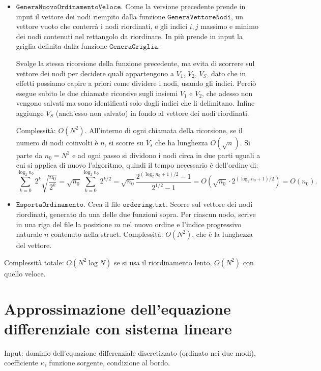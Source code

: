 \documentclass{article}
\begin{document}
\begin{itemize}
\item $\texttt{GeneraNuovoOrdinamentoVeloce}$.
Come la versione precedente prende in input il vettore dei nodi riempito dalla funzione $\texttt{GeneraVettoreNodi}$, un vettore vuoto che conterrà i nodi riordinati, e gli indici $i,j$ massimo e minimo dei nodi contenuti nel rettangolo da riordinare.
In più prende in input la griglia definita dalla funzione $\texttt{GeneraGriglia}$.

Svolge la stessa ricorsione della funzione precedente, ma evita di scorrere sul vettore dei nodi per decidere quali appartengono a $V_1$, $V_2$, $V_S$, dato che in effetti possiamo capire a priori come dividere i nodi, usando gli indici.
Perciò esegue subito le due chiamate ricorsive sugli insiemi $V_1$ e $V_2$, che adesso non vengono salvati ma sono identificati solo dagli indici che li delimitano.
Infine aggiunge $V_S$ (anch'esso non salvato) in fondo al vettore dei nodi riordinati.

Complessità: $O(N^2)$. All'interno di ogni chiamata della ricorsione, se il numero di nodi coinvolti è $n$, si scorre su $V_s$ che ha lunghezza $O(\sqrt{n})$. Si parte da $n_0 = N^2$ e ad ogni passo si dividono i nodi circa in due parti uguali a cui si applica di nuovo l'algoritmo, quindi il tempo necessario è dell'ordine di:
$$\sum_{k=0} ^{\log_2 n_0} 2^k \sqrt{\frac{n_0}{2^k}} = \sqrt{n_0} \sum_{k=0} ^{\log_2 n_0} 2^{k/2} = \sqrt{n_0} \frac{2^{(\log_2 n_0 +1)/2} - 1}{2^{1/2} - 1} = O(\sqrt{n_0} \cdot 2^{(\log_2 n_0 +1)/2}) = O(n_0).$$

\item $\texttt{EsportaOrdinamento}$.
Crea il file $\texttt{ordering.txt}$.
Scorre sul vettore dei nodi riordinati, generato da una delle due funzioni sopra.
Per ciascun nodo, scrive in una riga del file la posizione $m$ nel nuovo ordine e l'indice progressivo naturale $n$ contenuto nella struct.
Complessità: $O(N^2)$, che è la lunghezza del vettore.
\end{itemize}

Complessità totale: $O(N^2 \log N)$ se si usa il riordinamento lento, $O(N^2)$ con quello veloce.


\section{Approssimazione dell'equazione differenziale con sistema lineare}
Input: dominio dell'equazione differenziale discretizzato (ordinato nei due modi), coefficiente $\kappa$, funzione sorgente, condizione al bordo.
\end{document}
